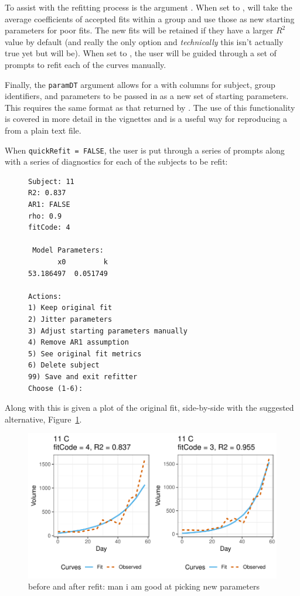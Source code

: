 To assist with the refitting process is the argument . When set to ,  will take the average coefficients of accepted fits within a group and use those as new starting parameters for poor fits. The new fits will be retained if they have a larger $R^2$ value by default (and really the only option and \textit{technically} this isn't actually true yet but will be). When set to , the user will be guided through a set of prompts to refit each of the curves manually.

Finally, the \texttt{paramDT} argument allows for a  with columns for subject, group identifiers, and parameters to be passed in as a new set of starting parameters. This  requires the same format as that returned by . The use of this functionality is covered in more detail in the  vignettes and is a useful way for reproducing a  from a plain text file. 

When \texttt{quickRefit = FALSE}, the user is put through a series of prompts along with a series of diagnostics for each of the subjects to be refit:


\begin{singlespace}
\begin{figure}[H]
\centering
\begin{BVerbatim}
Subject: 11
R2: 0.837
AR1: FALSE
rho: 0.9
fitCode: 4

 Model Parameters:
       x0         k 
53.186497  0.051749 

Actions:
1) Keep original fit
2) Jitter parameters
3) Adjust starting parameters manually
4) Remove AR1 assumption
5) See original fit metrics
6) Delete subject
99) Save and exit refitter
Choose (1-6):
\end{BVerbatim}
\end{figure}
\end{singlespace}


Along with this is given a plot of the original fit, side-by-side with the suggested alternative, Figure~\ref{fig:refit_plot}. 

\begin{figure}[H]
\centering
\includegraphics{img/mouse_refit_plot.pdf}
\caption{before and after refit: man i am good at picking new parameters}
\label{fig:refit_plot}
\end{figure}

